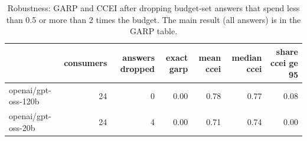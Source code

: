 \begin{table}[!htbp]\centering\small
\caption{Robustness: GARP and CCEI after dropping budget-set answers that spend less than 0.5 or more than 2 times the budget. The main result (all answers) is in the GARP table.}\label{tab:garp_robust}
\begin{tabular}{lrrrrrr}
\hline
 & consumers & answers dropped & exact garp & mean ccei & median ccei & share ccei ge 95 \\ \hline
openai/gpt-oss-120b & 24 & 0 & 0.00 & 0.78 & 0.77 & 0.08 \\
openai/gpt-oss-20b & 24 & 4 & 0.00 & 0.71 & 0.74 & 0.00 \\
\hline
\end{tabular}
\end{table}